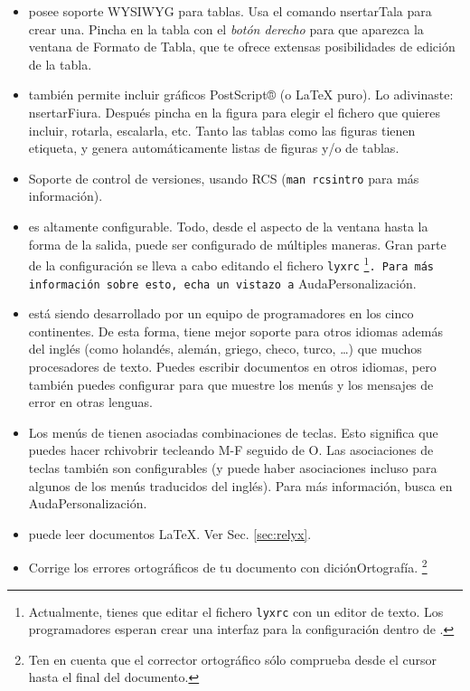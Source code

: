 \begin{itemize}
\item \LyX{} posee soporte WYSIWYG para tablas. Usa el comando \textsf{}\textsf{nsertar\lyxarrow{}Ta}\textsf{}\textsf{la}
para crear una. Pincha en la tabla con el \emph{botón derecho} para
que aparezca la ventana de Formato de \textsf{Tabla}, que te ofrece
extensas posibilidades de edición de la tabla.
\item \LyX{} también permite incluir gráficos PostScript® (o \LaTeX{} puro).
Lo adivinaste: \textsf{}\textsf{nsertar\lyxarrow{}Fi}\textsf{}\textsf{ura}\@.
Después pincha en la figura para elegir el fichero que quieres incluir,
rotarla, escalarla, etc. Tanto las tablas como las figuras tienen
etiqueta, y \LyX{} genera automáticamente listas de figuras y/o de
tablas.
\item Soporte de control de versiones, usando RCS (\texttt{man rcsintro}
para más información).
\item \LyX{} es altamente configurable. Todo, desde el aspecto de la ventana
hasta la forma de la salida, puede ser configurado de múltiples maneras.
Gran parte de la configuración se lleva a cabo editando el fichero
\texttt{lyxrc}%
\footnote{Actualmente, tienes que editar el fichero \texttt{lyxrc} con un editor
de texto. Los programadores esperan crear una interfaz para la configuración
dentro de \LyX{}.%
}\texttt{. Para más información sobre esto, echa un vistazo a} \textsf{A}\textsf{}\textsf{uda\lyxarrow{}Personalización\@.}
\item \LyX{} está siendo desarrollado por un equipo de programadores en
los cinco continentes. De esta forma, tiene mejor soporte para otros
idiomas además del inglés (como holandés, alemán, griego, checo, turco,
\ldots{}) que muchos procesadores de texto. Puedes escribir documentos
en otros idiomas, pero también puedes configurar \LyX{} para que muestre
los menús y los mensajes de error en otras lenguas.
\item Los menús de \LyX{} tienen asociadas combinaciones de teclas. Esto
significa que puedes hacer \textsf{}\textsf{rchivo\lyxarrow{}}\textsf{}\textsf{brir}
tecleando \textsf{M-F} seguido de \textsf{O}. Las asociaciones de
teclas también son configurables (y puede haber asociaciones incluso
para algunos de los menús traducidos del inglés). Para más información,
busca en \textsf{A}\textsf{}\textsf{uda\lyxarrow{}Personalización\@.}
\item \LyX{} puede leer documentos \LaTeX{}. Ver Sec. \ref{sec:relyx}.
\item Corrige los errores ortográficos de tu documento con \textsf{}\textsf{dición\lyxarrow{}Ortografía}\@.%
\footnote{Ten en cuenta que el corrector ortográfico sólo comprueba desde el
cursor hasta el final del documento.%
}
\end{itemize}

